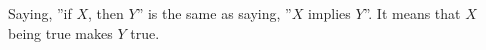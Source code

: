 Saying, ''if $X$, then $Y$'' is the same as saying,
''$X$ implies $Y$''. It means that $X$ being true
makes $Y$ true.
